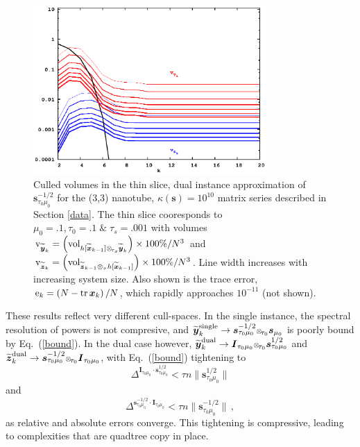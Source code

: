 \documentclass[letterpaper,twocolumn,amsmath,amsfont,amssymb,english,aps,jcp,preprintnumbers,groupaddress,nofootinbib,tightenlines,floatfix]{revtex4}
\newcommand{\mat}[1]{\boldsymbol{#1}}
\newcommand{\ot}{  {\scriptstyle \otimes}_{ \tau } }
\newcommand{\ots}{ {\scriptstyle \otimes}_{ \! \tau_s } }
\newcommand{\oto}{ {\scriptstyle \otimes}_{ \! \tau_0 } }
\theoremstyle{plain}
\theoremstyle{remark}
\theoremstyle{plain}
\begin{document}
\begin{figure}[h]\label{regularized_dual}
 \includegraphics[width=3.5in]{fig_33_tube_cond_10_regularized/33_tube_k10_regularized_dual.eps}
\caption{
Culled volumes in the thin slice, dual instance approximation of $\mat{s}^{-1/2}_{\tau_0 \mu_0}$
for the (3,3) nanotube, $\kappa(\mat{s})=10^{10}$ matrix series 
described in Section \ref{data}. The thin slice cooresponds to $\mu_0=.1, \tau_0=.1 \;  \&  \; \tau_s=.001$ 
with volumes 
${\rm v}_{\widetilde{\mat{y}}_k}= \left( {\rm vol}_{  h[\widetilde{\mat{x}}_{k-1}] \ots \widetilde{\mat{y}}_k }  \right) \times 100\% /N^3$ and  
${\rm v}_{\widetilde{\mat{z}}_k}= \left( {\rm vol}_{\widetilde{\mat{z}}_{k-1} \ot  h[\widetilde{\mat{x}}_{k-1}]} \right) \times 100\% /N^3$.
Line width increases with increasing system size. 
Also shown is the trace error, ${\rm e}_{k} = \left( N-{\rm tr}\,\mat{x}_k \right)/N$, which rapidly approaches $10^{-11}$ (not shown). }
\end{figure} 

These results reflect very different cull-spaces.  In the single instance, the spectral resolution of powers is not compresive, and  
$\widetilde{\mat{y}}^{\rm single}_k \rightarrow  \mat{s}^{-1/2}_{\tau_0 \mu_0} \oto \mat{s}_{\mu_0}$ is  poorly bound by Eq.~(\ref{bound}).
In the dual case however, $\widetilde{\mat{y}}^{\rm dual}_k \rightarrow  \mat{I}_{\tau_0 \mu_0} \oto \mat{s}^{1/2}_{\tau_0 \mu_0}$
and $\widetilde{\mat{z}}^{\rm dual}_k \rightarrow  \mat{s}^{-1/2}_{\tau_0 \mu_0} \oto \mat{I}_{\tau_0 \mu_0}$, 
with Eq.~(\ref{bound}) tightening to
\begin{equation}\label{boundY}
\Delta^{\mat{I}_{\tau_0 \mu_0} \cdot \mat{s}^{1/2}_{\tau_0 \mu_0}} <  \tau n \lVert \mat{s}^{1/2}_{\tau_0 \mu_0} \rVert
\end{equation}
and 
\begin{equation}\label{boundZ}
\Delta^{ \mat{s}^{-1/2}_{\tau_0 \mu_0}\cdot \mat{I}_{\tau_0 \mu_0}}  <  \tau n \lVert \mat{s}^{-1/2}_{\tau_0 \mu_0} \rVert \, ,
\end{equation}
as relative and absolute errors converge.  This tightening is compressive, leading to complexities that are quadtree copy in place.   
\end{document}
